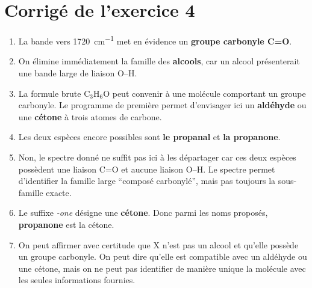 \documentclass[11pt,a4paper]{article}
\begin{document}
\section*{Corrigé de l'exercice 4}
\begin{enumerate}[label=\textbf{\arabic*.},leftmargin=1.2em]
    \item La bande vers \SI{1720}{cm^{-1}} met en évidence un \textbf{groupe carbonyle C=O}.

    \item On élimine immédiatement la famille des \textbf{alcools}, car un alcool présenterait une bande large de liaison O--H.

    \item La formule brute C$_3$H$_6$O peut convenir à une molécule comportant un groupe carbonyle. Le programme de première permet d'envisager ici un \textbf{aldéhyde} ou une \textbf{cétone} à trois atomes de carbone.

    \item Les deux espèces encore possibles sont \textbf{le propanal} et \textbf{la propanone}.

    \item Non, le spectre donné ne suffit pas ici à les départager car ces deux espèces possèdent une liaison C=O et aucune liaison O--H. Le spectre permet d'identifier la famille large ``composé carbonylé'', mais pas toujours la sous-famille exacte.

    \item Le suffixe \textit{-one} désigne une \textbf{cétone}. Donc parmi les noms proposés, \textbf{propanone} est la cétone.

    \item On peut affirmer avec certitude que X n'est pas un alcool et qu'elle possède un groupe carbonyle. On peut dire qu'elle est compatible avec un aldéhyde ou une cétone, mais on ne peut pas identifier de manière unique la molécule avec les seules informations fournies.
\end{enumerate}
\end{document}
